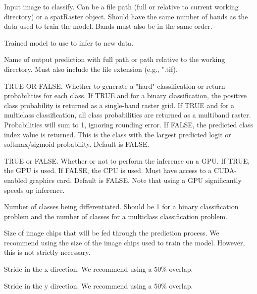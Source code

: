 \documentclass[a4paper]{book}
\begin{document}
\begin{Arguments}
\begin{ldescription}
\item[\code{imgIn}] Input image to classify. Can be a file path (full or relative to
current working directory) or a spatRaster object. Should have the same number
of bands as the data used to train the model. Bands must also be in the same
order.

\item[\code{model}] Trained model to use to infer to new data.

\item[\code{predOut}] Name of output prediction with full path or path relative to
the working directory. Must also include the file extension (e.g., ".tif).

\item[\code{probs}] TRUE OR FALSE. Whether to generate a "hard" classification or
return probabilities for each class. If TRUE and for a binary classification,
the positive class probability is returned as a single-band raster grid. If
TRUE and for a multiclass classification, all class probabilities are returned as
a multiband raster. Probabilities will sum to 1, ignoring rounding error. If
FALSE, the predicted class index value is returned. This is the class with
the largest predicted logit or softmax/sigmoid probability. Default is FALSE.

\item[\code{useCUDA}] TRUE or FALSE. Whether or not to perform the inference on a GPU.
If TRUE, the GPU is used. If FALSE, the CPU is used. Must have access to a CUDA-
enabled graphics card. Default is FALSE. Note that using a GPU significantly
speeds up inference.

\item[\code{nCls}] Number of classes being differentiated. Should be 1 for a binary
classification problem and the number of classes for a multiclass classification
problem.

\item[\code{chpSize}] Size of image chips that will be fed through the prediction process.
We recommend using the size of the image chips used to train the model. However,
this is not strictly necessary.

\item[\code{stride\_x}] Stride in the x direction. We recommend using a 50\% overlap.

\item[\code{stride\_y}] Stride in the y direction. We recommend using a 50\% overlap.


\end{ldescription}
\end{Arguments}
\end{document}
